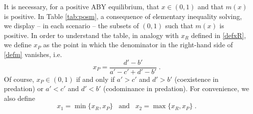 \documentclass[12pt]{article}
\theoremstyle{definition}
\begin{document}
It is necessary, for a positive ABY equilibrium, that $x \in (0,1)$ and that $m(x)$ is positive. In Table \ref{tab:posm}, a consequence of elementary inequality solving, we display -- in each scenario -- the subsets of $(0,1)$ such that $m(x)$ is positive. In order to understand the table, in analogy with $x_R$ defined in \eqref{defxR}, we define $x_P$ as the point in which the denominator in the right-hand side of \eqref{defm} vanishes, i.e. 
\begin{equation}  \label{defxP}
	x_P= \frac{d'-b'}{a'-c'+d'-b'}\;.
\end{equation}
Of course, $x_P \in (0,1)$ if and only if $a'>c'$ and $d'>b'$ (coexistence in predation) or $a'<c'$ and $d'<b'$ (codominance in predation). For convenience, we also define
\begin{equation}  \label{defx1x2}
	x_1 = \min\{x_R,x_P\}  \;\;\;\mathrm{and} \;\;\; x_2 = \max\{x_R,x_P\}\;.
\end{equation}
\end{document}
